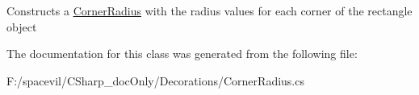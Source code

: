 Constructs a \mbox{\hyperlink{class_space_v_i_l_1_1_decorations_1_1_corner_radius}{Corner\+Radius}} with the radius values for each corner of the rectangle object 



The documentation for this class was generated from the following file\+:\begin{DoxyCompactItemize}
\item 
F\+:/spacevil/\+C\+Sharp\+\_\+doc\+Only/\+Decorations/Corner\+Radius.\+cs\end{DoxyCompactItemize}
